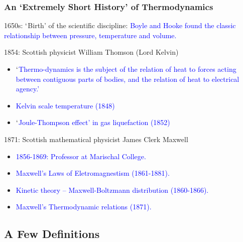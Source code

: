 \documentclass[10pt,compress,handout,ignorenonframetext]{beamer}
\begin{document}
\begin{frame}
 \frametitle{An `Extremely Short History' of Thermodynamics}

   \begin{block}{1650s: $\lq$Birth' of the scientific discipline:}
   \textcolor{blue}{Boyle and Hooke found the classic relationship between pressure, temperature and volume.}
   \end{block}


   \begin{block}{1854: Scottish physicist William Thomson (Lord Kelvin)}
     \begin{itemize}
       \item \textcolor{blue}{$\lq$Thermo-dynamics is the subject of the relation of heat to forces acting between contiguous parts of bodies, and the relation of heat to electrical agency.'}
       \item \textcolor{blue}{Kelvin scale temperature (1848)}
       \item \textcolor{blue}{$\lq$Joule-Thompson effect' in gas liquefaction (1852)}
     \end{itemize}
   \end{block}

   \begin{block}{1871: Scottish mathematical physicist James Clerk Maxwell}
     \begin{itemize}
       \item \textcolor{blue}{1856-1869: Professor at Marischal College.}
       \item \textcolor{blue}{Maxwell's Laws of Eletromagnestism (1861-1881).}
       \item \textcolor{blue}{Kinetic theory -- Maxwell-Boltzmann distribution (1860-1866).}
       \item \textcolor{blue}{Maxwell's Thermodynamic relations (1871).}
     \end{itemize}
   \end{block}

\end{frame}

\subsection{A Few Definitions} 
\end{document}
